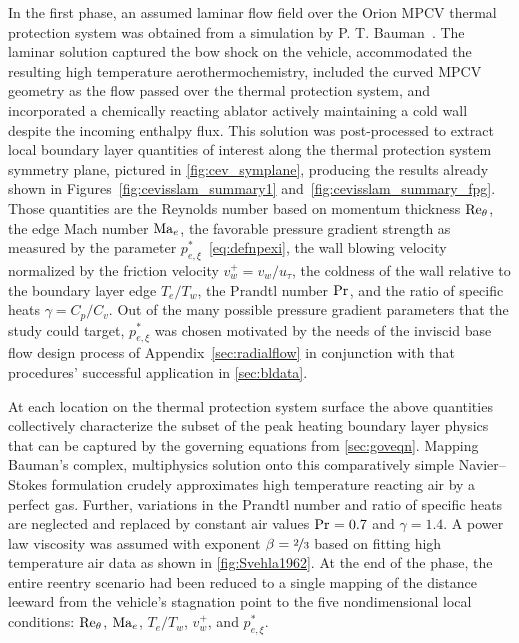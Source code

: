 In the first phase, an assumed laminar flow field over the Orion MPCV thermal
protection system was obtained from a simulation by P. T.
Bauman~\citep{Kirk2014Modeling,Bauman2011Loose}.  The laminar solution captured
the bow shock on the vehicle, accommodated the resulting high temperature
aerothermochemistry, included the curved MPCV geometry as the flow passed over
the thermal protection system, and incorporated a chemically reacting ablator
actively maintaining a cold wall despite the incoming enthalpy flux.  This
solution was post-processed to extract local boundary layer quantities of
interest along the thermal protection system symmetry plane, pictured in
\autoref{fig:cev_symplane}, producing the results already shown in
Figures~\ref{fig:cevisslam_summary1} and~\ref{fig:cevisslam_summary_fpg}.
%
Those quantities are the Reynolds number based on momentum thickness
$\Reynolds[\theta]{}$, the edge Mach number $\Mach[e]{}$, the favorable pressure
gradient strength as measured by the parameter
$p_{e,\xi}^{\ast}$~\eqref{eq:defnpexi}, the wall blowing velocity normalized by
the friction velocity $v_w^{+} = v_w / u_\tau$, the coldness of the wall
relative to the boundary layer edge $T_e/T_w$, the Prandtl number $\Prandtl$,
and the ratio of specific heats $\gamma = C_p / C_v$.
%
Out of the many possible pressure gradient parameters
that the study could target,
$p_{e,\xi}^{\ast}$ was chosen motivated by the needs of the inviscid base flow
design process of Appendix~\ref{sec:radialflow} in conjunction with that
procedures' successful application in \autoref{sec:bldata}.

At each location on the thermal protection system surface the above quantities
collectively characterize the subset of the peak heating boundary layer physics
that can be captured by the governing equations from \autoref{sec:goveqn}.
%
Mapping Bauman's complex, multiphysics solution onto this comparatively simple
Navier--Stokes formulation crudely approximates high temperature reacting air by
a perfect gas.  Further, variations in the Prandtl number and ratio of specific
heats are neglected and replaced by constant air values $\Prandtl=0.7$ and
$\gamma=1.4$.  A power law viscosity was assumed with exponent
$\beta=\nicefrac{2}{3}$ based on fitting high temperature air data as shown in
\autoref{fig:Svehla1962}.
%
At the end of the phase, the entire reentry scenario had been reduced to a
single mapping of the distance leeward from the vehicle's stagnation point
to the five nondimensional local conditions:
$\Reynolds[\theta]{}$, $\Mach[e]{}$, $T_e/T_w$, $v_w^{+}$, and
$p_{e,\xi}^{\ast}$.

